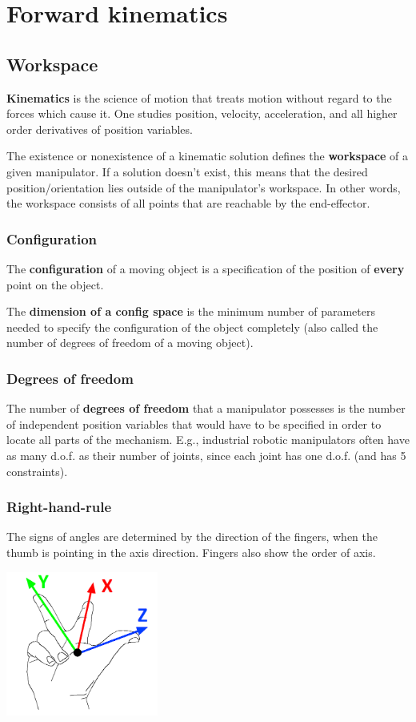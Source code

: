 \section{Forward kinematics}
\subsection{Workspace}
\textbf{Kinematics} is the science of motion that treats motion without regard to the forces which cause it. One studies position, velocity, acceleration, and all higher order derivatives of position variables.

The existence or nonexistence of a kinematic solution defines the \textbf{workspace} of a given manipulator. If a solution doesn't exist, this means that the desired position/orientation lies outside of the manipulator's workspace. In other words, the workspace consists of all points that are reachable by the end-effector.

\subsubsection{Configuration}

The \textbf{configuration} of a moving object is a specification of the position of \textbf{every} point on the object. 

The \textbf{dimension of a config space} is the minimum number of parameters needed to specify the configuration of the object completely (also called the number of degrees of freedom of a moving object).

\subsubsection{Degrees of freedom}
The number of \textbf{degrees of freedom} that a manipulator possesses is the number of independent position variables that would have to be specified in order to locate all parts of the mechanism. E.g., industrial robotic manipulators often have as many d.o.f. as their number of joints, since each joint has one d.o.f. (and has 5 constraints).

\subsubsection{Right-hand-rule}
The signs of angles are determined by the direction of the fingers, when the thumb is pointing in the axis direction. Fingers also show the order of axis.

\begin{center}
	\includegraphics[width=5cm]{sections/imgs/2_right_hand_rule.png}
\end{center}

